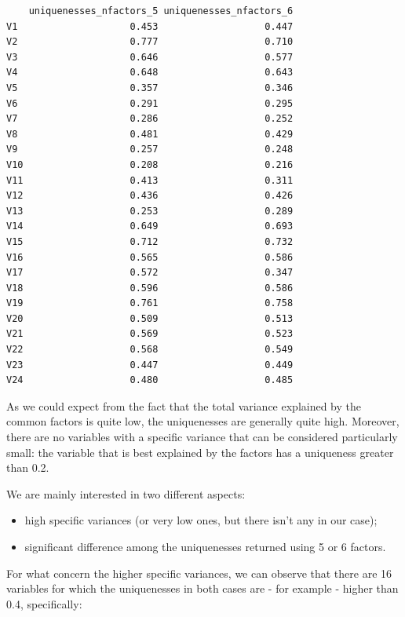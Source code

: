\documentclass[
  letterpaper,
  DIV=11,
  numbers=noendperiod]{scrartcl}
\providecommand{\tightlist}{%
  \setlength{\itemsep}{0pt}\setlength{\parskip}{0pt}}\usepackage{longtable,booktabs,array}
\begin{document}
\begin{verbatim}
    uniquenesses_nfactors_5 uniquenesses_nfactors_6
V1                    0.453                   0.447
V2                    0.777                   0.710
V3                    0.646                   0.577
V4                    0.648                   0.643
V5                    0.357                   0.346
V6                    0.291                   0.295
V7                    0.286                   0.252
V8                    0.481                   0.429
V9                    0.257                   0.248
V10                   0.208                   0.216
V11                   0.413                   0.311
V12                   0.436                   0.426
V13                   0.253                   0.289
V14                   0.649                   0.693
V15                   0.712                   0.732
V16                   0.565                   0.586
V17                   0.572                   0.347
V18                   0.596                   0.586
V19                   0.761                   0.758
V20                   0.509                   0.513
V21                   0.569                   0.523
V22                   0.568                   0.549
V23                   0.447                   0.449
V24                   0.480                   0.485
\end{verbatim}

As we could expect from the fact that the total variance explained by
the common factors is quite low, the uniquenesses are generally quite
high. Moreover, there are no variables with a specific variance that can
be considered particularly small: the variable that is best explained by
the factors has a uniqueness greater than 0.2.

We are mainly interested in two different aspects:

\begin{itemize}
\tightlist
\item
  high specific variances (or very low ones, but there isn't any in our
  case);
\item
  significant difference among the uniquenesses returned using 5 or 6
  factors.
\end{itemize}

For what concern the higher specific variances, we can observe that
there are 16 variables for which the uniquenesses in both cases are -
for example - higher than 0.4, specifically:
\end{document}
